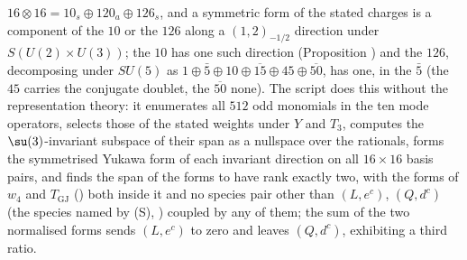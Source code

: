 $16 \otimes 16 = 10_{s} \oplus 120_{a} \oplus 126_{s}$, and a symmetric form of the stated charges is a component of the $10$ or the $126$ along a $(1, 2)_{-1/2}$ direction under $S(U(2) \times U(3))$; the $10$ has one such direction (Proposition ) and the $126$, decomposing under $SU(5)$ as $1 \oplus \bar 5 \oplus 10 \oplus \overline{15} \oplus 45 \oplus \overline{50}$, has one, in the $\bar 5$ (the $45$ carries the conjugate doublet, the $\overline{50}$ none). The script does this without the representation theory: it enumerates all $512$ odd monomials in the ten mode operators, selects those of the stated weights under $Y$ and $T_{3}$, computes the $\su(3)$-invariant subspace of their span as a nullspace over the rationals, forms the symmetrised Yukawa form of each invariant direction on all $16 \times 16$ basis pairs, and finds the span of the forms to have rank exactly two, with the forms of $w_{4}$ and $T_{\mathrm{GJ}}$ () both inside it and no species pair other than $(L, e^{c})$, $(Q, d^{c})$ (the species named by (S), ) coupled by any of them; the sum of the two normalised forms sends $(L, e^{c})$ to zero and leaves $(Q, d^{c})$, exhibiting a third ratio.
